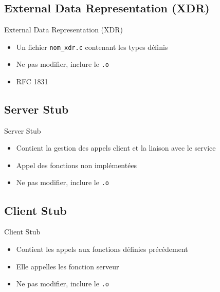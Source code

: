 \section{\sectitle}
\begin{frame}[containsverbatim]{\sectitle}
    \def\subsectitle{External Data Representation (XDR)}
    \subsection{\subsectitle}
    \begin{block}{\subsectitle}
        \begin{itemize}
            \item Un fichier \verb+nom_xdr.c+ contenant les types définis
            \item Ne pas modifier, inclure le \verb+.o+
            \item RFC 1831
        \end{itemize}
    \end{block}
    \def\subsectitle{Server Stub}
    \subsection{\subsectitle}
    \begin{block}{\subsectitle}
        \begin{itemize}
            \item Contient la gestion des appels client et la liaison avec le
                service
            \item Appel des fonctions non implémentées
            \item Ne pas modifier, inclure le \verb+.o+
        \end{itemize}
    \end{block}
    \def\subsectitle{Client Stub}
    \subsection{\subsectitle}
    \begin{block}{\subsectitle}
        \begin{itemize}
            \item Contient les appels aux fonctions définies précédement
            \item Elle appelles les fonction serveur
            \item Ne pas modifier, inclure le \verb+.o+
        \end{itemize}
    \end{block}
    \def\subsectitle{Header}

\end{frame}
